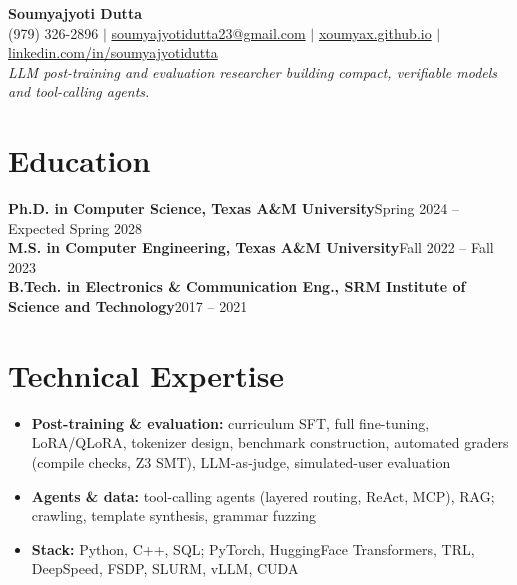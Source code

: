 \documentclass[letterpaper,10pt]{article}
\newcommand{\heading}[2]{\textbf{#1}\hfill #2\\}
\begin{document}
\begin{center}
  {\LARGE\bfseries Soumyajyoti Dutta}\\[3pt]
  (979) 326-2896 $|$
  \href{mailto:soumyajyotidutta23@gmail.com}{soumyajyotidutta23@gmail.com} $|$
  \href{https://xoumyax.github.io/}{xoumyax.github.io} $|$
  \href{https://www.linkedin.com/in/soumyajyotidutta/}{linkedin.com/in/soumyajyotidutta}\\[3pt]
  \textit{LLM post-training and evaluation researcher building compact, verifiable models and tool-calling agents.}
\end{center}
\vspace{-8pt}

\section{Education}
\heading{Ph.D. in Computer Science, Texas A\&M University}{Spring 2024 -- Expected Spring 2028}
\heading{M.S. in Computer Engineering, Texas A\&M University}{Fall 2022 -- Fall 2023}
\heading{B.Tech. in Electronics \& Communication Eng., SRM Institute of Science and Technology}{2017 -- 2021}

\section{Technical Expertise}
\begin{itemize}
  \item \textbf{Post-training \& evaluation:} curriculum SFT, full fine-tuning, LoRA/QLoRA, tokenizer design, benchmark construction, automated graders (compile checks, Z3 SMT), LLM-as-judge, simulated-user evaluation
  \item \textbf{Agents \& data:} tool-calling agents (layered routing, ReAct, MCP), RAG; crawling, template synthesis, grammar fuzzing
  \item \textbf{Stack:} Python, C++, SQL; PyTorch, HuggingFace Transformers, TRL, DeepSpeed, FSDP, SLURM, vLLM, CUDA
\end{itemize}
\end{document}
